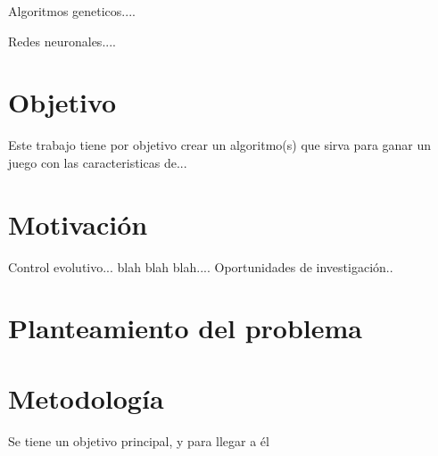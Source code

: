 Algoritmos geneticos.... 

Redes neuronales.... 




\blindtext

\section{Objetivo}

Este trabajo tiene por objetivo crear un algoritmo(s) que sirva para ganar un juego con las caracteristicas de...
 
\blindtext
\section{Motivación}

Control evolutivo... blah blah blah.... Oportunidades de investigación..

\blindtext
\section{Planteamiento del problema}



\blindtext
\section{Metodología} 

Se tiene un objetivo principal, y para llegar a \'el %


\blindtext

